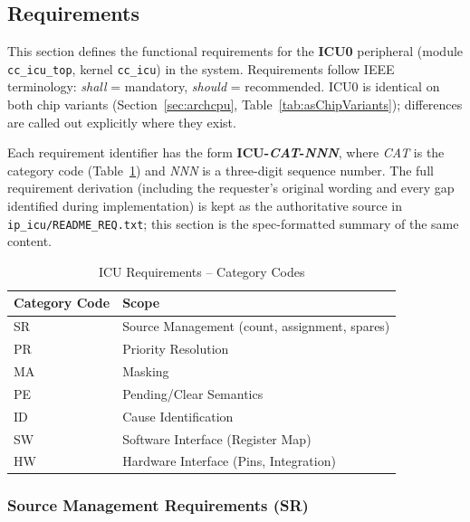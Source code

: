 
\label{sec:icufunc01}

\subsection{Requirements}
\label{subsec:icureq01}

This section defines the functional requirements for the \textbf{ICU0}
peripheral (module \texttt{cc\_icu\_top}, kernel \texttt{cc\_icu}) in the
\aschip{} system. Requirements follow IEEE terminology:
\textit{shall} = mandatory, \textit{should} = recommended.
ICU0 is identical on both chip variants (Section~\ref{sec:archcpu},
Table~\ref{tab:asChipVariants}); differences are called out explicitly
where they exist.

Each requirement identifier has the form \textbf{ICU-\textit{CAT}-\textit{NNN}},
where \textit{CAT} is the category code (Table~\ref{tab:asIcuReqCat}) and
\textit{NNN} is a three-digit sequence number. The full requirement
derivation (including the requester's original wording and every gap
identified during implementation) is kept as the authoritative source in
\texttt{ip\_icu/README\_REQ.txt}; this section is the spec-formatted
summary of the same content.

\begin{table}[H]
\caption{ICU Requirements -- Category Codes}
\label{tab:asIcuReqCat}
\centering
\begin{tabularx}{\textwidth}{|l |X|}
  \hline
  Category Code & Scope \\
  \hline
  \hline
  SR & Source Management (count, assignment, spares) \\
  \hline
  PR & Priority Resolution \\
  \hline
  MA & Masking \\
  \hline
  PE & Pending/Clear Semantics \\
  \hline
  ID & Cause Identification \\
  \hline
  SW & Software Interface (Register Map) \\
  \hline
  HW & Hardware Interface (Pins, Integration) \\
  \hline
\end{tabularx}
\end{table}

\subsubsection{Source Management Requirements (SR)}

